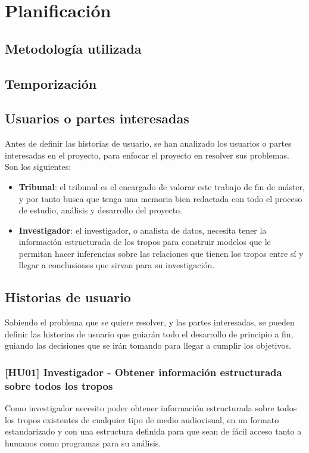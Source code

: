 \chapter{Planificación}

\section{Metodología utilizada}


\section{Temporización}

\section{Usuarios o partes interesadas}
Antes de definir las historias de usuario, se han analizado los usuarios o partes interesadas en el proyecto, para enfocar el proyecto en resolver sus problemas. Son los siguientes:
\begin{itemize}
    \item \textbf{Tribunal}: el tribunal es el encargado de valorar este trabajo de fin de máster, y por tanto busca que tenga una memoria bien redactada con todo el proceso de estudio, análisis y desarrollo del proyecto.
    \item \textbf{Investigador}: el investigador, o analista de datos, necesita tener la información estructurada de los tropos para construir modelos que le permitan hacer inferencias sobre las relaciones que tienen los tropos entre sí y llegar a conclusiones que sirvan para su investigación.
\end{itemize}

\section{Historias de usuario}
Sabiendo el problema que se quiere resolver, y las partes interesadas, se pueden definir las historias de usuario que guiarán todo el desarrollo de principio a fin, guiando las decisiones que se irán tomando para llegar a cumplir los objetivos.

\subsection{[HU01] Investigador - Obtener información estructurada sobre todos los tropos}
Como investigador necesito poder obtener información estructurada sobre todos los tropos existentes de cualquier tipo de medio audiovisual, en un formato estandarizado y con una estructura definida para que sean de fácil acceso tanto a humanos como programas para su análisis.

